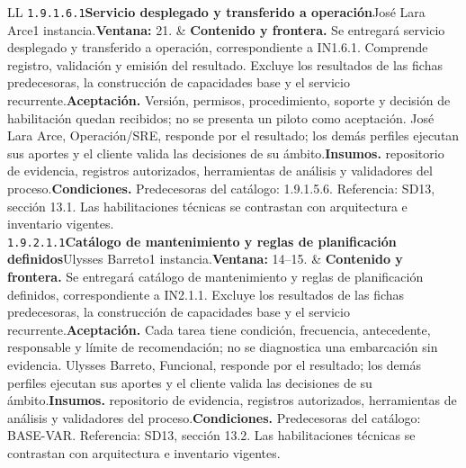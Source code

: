 \begin{longtable}{L{\tabcolsep\relax}L{\tabcolsep\relax}}
\texttt{1.\allowbreak{}9.\allowbreak{}1.\allowbreak{}6.\allowbreak{}1}\newline{}\textbf{Servicio desplegado y transferido a operación}\newline{}José Lara Arce\newline{}1 instancia.\newline{}\textbf{Ventana:} 21. & \textbf{Contenido y frontera.} Se entregará servicio desplegado y transferido a operación, correspondiente a IN1.6.1. Comprende registro, validación y emisión del resultado. Excluye los resultados de las fichas predecesoras, la construcción de capacidades base y el servicio recurrente.\newline{}\textbf{Aceptación.} Versión, permisos, procedimiento, soporte y decisión de habilitación quedan recibidos; no se presenta un piloto como aceptación. José Lara Arce, Operación/SRE, responde por el resultado; los demás perfiles ejecutan sus aportes y el cliente valida las decisiones de su ámbito.\newline{}\textbf{Insumos.} repositorio de evidencia, registros autorizados, herramientas de análisis y validadores del proceso.\newline{}\textbf{Condiciones.} Predecesoras del catálogo: 1.9.1.5.6. Referencia: SD13, sección 13.1. Las habilitaciones técnicas se contrastan con arquitectura e inventario vigentes.\\\hline
\texttt{1.\allowbreak{}9.\allowbreak{}2.\allowbreak{}1.\allowbreak{}1}\newline{}\textbf{Catálogo de mantenimiento y reglas de planificación definidos}\newline{}Ulysses Barreto\newline{}1 instancia.\newline{}\textbf{Ventana:} 14--15. & \textbf{Contenido y frontera.} Se entregará catálogo de mantenimiento y reglas de planificación definidos, correspondiente a IN2.1.1. Excluye los resultados de las fichas predecesoras, la construcción de capacidades base y el servicio recurrente.\newline{}\textbf{Aceptación.} Cada tarea tiene condición, frecuencia, antecedente, responsable y límite de recomendación; no se diagnostica una embarcación sin evidencia. Ulysses Barreto, Funcional, responde por el resultado; los demás perfiles ejecutan sus aportes y el cliente valida las decisiones de su ámbito.\newline{}\textbf{Insumos.} repositorio de evidencia, registros autorizados, herramientas de análisis y validadores del proceso.\newline{}\textbf{Condiciones.} Predecesoras del catálogo: BASE-VAR. Referencia: SD13, sección 13.2. Las habilitaciones técnicas se contrastan con arquitectura e inventario vigentes.\\\hline

\end{longtable}
